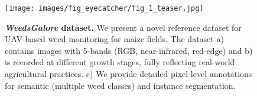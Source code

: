 \begin{figure}
    \centering
    {\texttt{[image: images/fig\_eyecatcher/fig\_1\_teaser.jpg]}}
    
    \caption {\textbf{\textit{WeedsGalore} dataset.} We present a novel reference dataset for UAV-based weed monitoring for maize fields. The dataset a) contains images with 5-bands (RGB, near-infrared, red-edge) and b) is recorded at different growth stages, fully reflecting real-world agricultural practices. c) We provide detailed pixel-level annotations for semantic (multiple weed classes) and instance segmentation.}
    \label{fig:eyecatcher}
\end{figure}
